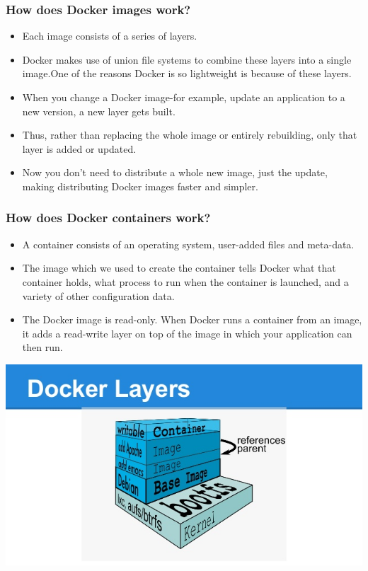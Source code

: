 \documentclass[11pt]{article}
\begin{document}
\subsubsection{How does Docker images work?}
\label{sec:orgheadline4}
\begin{itemize}
\item Each image consists of a series of layers.
\item Docker makes use of union file systems to combine these layers into a
single image.One of the reasons Docker is so lightweight is because of these
layers.
\item When you change a Docker image-for example, update an application to a new
version, a new layer gets built.
\item Thus, rather than replacing the whole image or entirely rebuilding, only
that layer is added or updated.
\item Now you don't need to distribute a whole new image, just the update,
making distributing Docker images faster and simpler.
\end{itemize}
\subsubsection{How does Docker containers work?}
\label{sec:orgheadline5}
\begin{itemize}
\item A container consists of an operating system, user-added files and
meta-data.
\item The image which we used to create the container tells Docker what that container
holds, what process to run when the container is launched, and a variety
of other configuration data.
\item The Docker image is read-only. When Docker runs a container from an image, it
adds a read-write layer on top of the image in which your application can then run.
\end{itemize}

\includegraphics[width=.9\linewidth]{./images/docker-layer.jpg}
\end{document}
